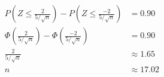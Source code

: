 \documentclass{uofa-eng-assignment}
\begin{document}
\begin{enumerate}
\begin{align*}
            P\left(Z \leq \frac{2}{5 / \sqrt{n}}\right) - P\left(Z \leq \frac{-2}{5 / \sqrt{n}}\right)                                            & = 0.90                     \\
            \Phi\left(\frac{2}{5 / \sqrt{n}}\right) - \Phi\left(\frac{-2}{5 / \sqrt{n}}\right)                                                    & = 0.90                     \\
            \frac{2}{5 / \sqrt{n}}                                                                                                                & \approx 1.65               \\
            n                                                                                                                                     & \approx \boldsymbol{17.02}
        \end{align*}
\end{enumerate}
\end{document}
